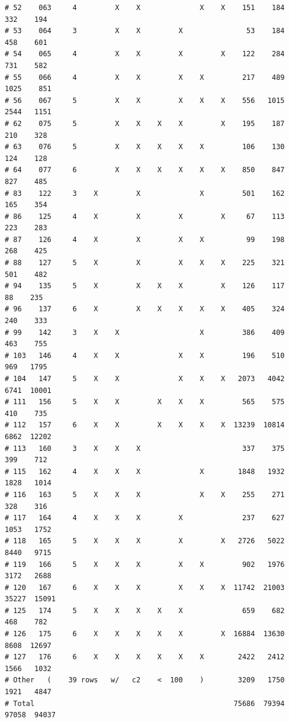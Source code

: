 \documentclass{article}\usepackage[]{graphicx}\usepackage[]{color}
\makeatletter
\newenvironment{kframe}{%
 \def\at@end@of@kframe{}%
 \ifinner\ifhmode%
  \def\at@end@of@kframe{\end{minipage}}%
  \begin{minipage}{\columnwidth}%
 \fi\fi%
 \def\FrameCommand##1{\hskip\@totalleftmargin \hskip-\fboxsep
 \colorbox{shadecolor}{##1}\hskip-\fboxsep
     \hskip-\linewidth \hskip-\@totalleftmargin \hskip\columnwidth}%
 \MakeFramed {\advance\hsize-\width
   \@totalleftmargin\z@ \linewidth\hsize
   \@setminipage}}%
 {\par\unskip\endMakeFramed%
 \at@end@of@kframe}
\newenvironment{knitrout}{}{} %
\makeatother
\begin{document}
\begin{knitrout}
\begin{kframe}
\begin{verbatim}
# 52    063     4         X    X              X    X    151    184    332    194
# 53    064     3         X    X         X               53    184    458    601
# 54    065     4         X    X         X         X    122    284    731    582
# 55    066     4         X    X         X    X         217    489   1025    851
# 56    067     5         X    X         X    X    X    556   1015   2544   1151
# 62    075     5         X    X    X    X         X    195    187    210    328
# 63    076     5         X    X    X    X    X         106    130    124    128
# 64    077     6         X    X    X    X    X    X    850    847    827    485
# 83    122     3    X         X              X         501    162    165    354
# 86    125     4    X         X         X         X     67    113    223    283
# 87    126     4    X         X         X    X          99    198    268    425
# 88    127     5    X         X         X    X    X    225    321    501    482
# 94    135     5    X         X    X    X         X    126    117     88    235
# 96    137     6    X         X    X    X    X    X    405    324    240    333
# 99    142     3    X    X                   X         386    409    463    755
# 103   146     4    X    X              X    X         196    510    969   1795
# 104   147     5    X    X              X    X    X   2073   4042   6741  10001
# 111   156     5    X    X         X    X    X         565    575    410    735
# 112   157     6    X    X         X    X    X    X  13239  10814   6862  12202
# 113   160     3    X    X    X                        337    375    399    712
# 115   162     4    X    X    X              X        1848   1932   1828   1014
# 116   163     5    X    X    X              X    X    255    271    328    316
# 117   164     4    X    X    X         X              237    627   1053   1752
# 118   165     5    X    X    X         X         X   2726   5022   8440   9715
# 119   166     5    X    X    X         X    X         902   1976   3172   2688
# 120   167     6    X    X    X         X    X    X  11742  21003  35227  15091
# 125   174     5    X    X    X    X    X              659    682    468    782
# 126   175     6    X    X    X    X    X         X  16884  13630   8608  12697
# 127   176     6    X    X    X    X    X    X        2422   2412   1566   1032
# Other   (    39 rows   w/   c2    <  100    )        3209   1750   1921   4847
# Total                                               75686  79394  97058  94037
\end{verbatim}
\begin{alltt}

\end{alltt}
\end{kframe}
\end{knitrout}
\end{document}
